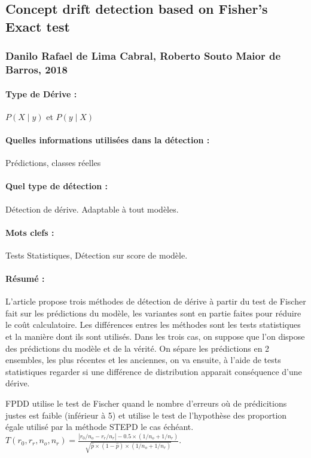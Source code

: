 \documentclass[11pt,a4paper]{report}
\begin{document}
\subsection{Concept drift detection based on Fisher’s Exact test}
\subsubsection{Danilo Rafael de Lima Cabral, Roberto Souto Maior de Barros, 2018}

\paragraph{Type de Dérive :} $P(X\mid y)$ et $P(y \mid X)$
\paragraph{Quelles informations utilisées dans la détection :} Prédictions, classes réelles
\paragraph{Quel type de détection :} Détection de dérive. Adaptable à tout modèles.

\paragraph{Mots clefs :} Tests Statistiques, Détection sur score de modèle.

\paragraph{Résumé :}
L'article propose trois méthodes de détection de dérive à partir du test de Fischer fait sur les prédictions du modèle, les variantes sont en partie faites pour réduire le coût calculatoire. Les différences entres les méthodes sont les tests statistiques et la manière dont ils sont utilisés. Dans les trois cas, on suppose que l'on dispose des prédictions du modèle et de la vérité. On sépare les prédictions en 2 ensembles, les plus récentes et les anciennes, on va ensuite, à l'aide de tests statistiques regarder si une différence de distribution apparait conséquence d'une dérive. 

FPDD utilise le test de Fischer quand le nombre d'erreurs où de prédicitions justes est faible (inférieur à 5) et utilise le test de l'hypothèse des proportion égale utilisé par la méthode STEPD le cas échéant. $T\left(r_{0}, r_{r}, n_{o}, n_{r}\right)=\frac{\left|r_{0} / n_{o}-r_{r} / n_{r}\right|-0.5 \times\left(1 / n_{o}+1 / n_{r}\right)}{\sqrt{\hat{p} \times(1-\hat{p}) \times\left(1 / n_{o}+1 / n_{r}\right)}}$.
\end{document}
